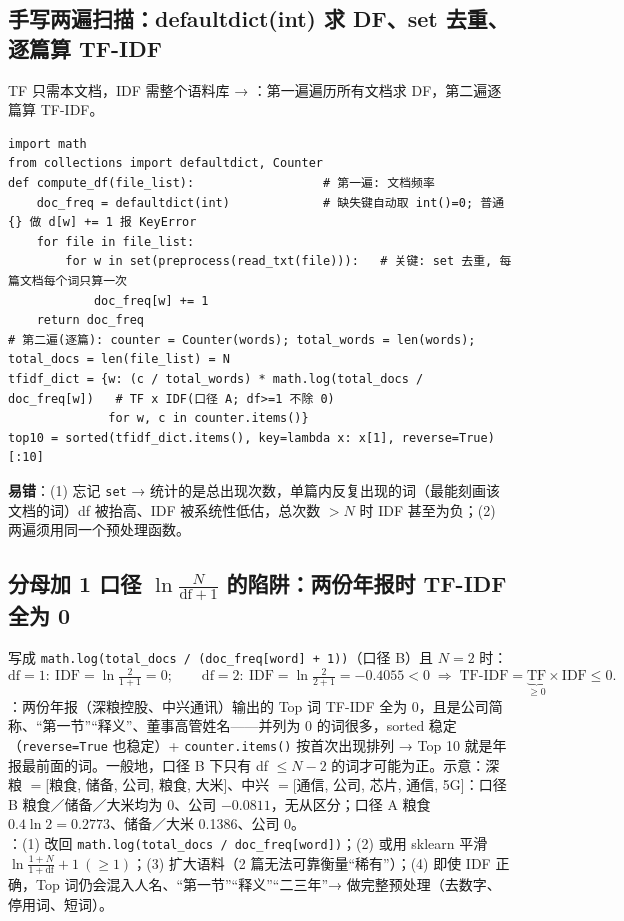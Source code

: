 \subsection{手写两遍扫描：defaultdict(int) 求 DF、set 去重、逐篇算 TF-IDF}
TF 只需本文档，IDF 需整个语料库 → ：第一遍遍历所有文档求 DF，第二遍逐篇算 TF-IDF。
\begin{lstlisting}[style=pyD08a]
import math
from collections import defaultdict, Counter
def compute_df(file_list):                  # 第一遍: 文档频率
    doc_freq = defaultdict(int)             # 缺失键自动取 int()=0; 普通 {} 做 d[w] += 1 报 KeyError
    for file in file_list:
        for w in set(preprocess(read_txt(file))):   # 关键: set 去重, 每篇文档每个词只算一次
            doc_freq[w] += 1
    return doc_freq
# 第二遍(逐篇): counter = Counter(words); total_words = len(words); total_docs = len(file_list) = N
tfidf_dict = {w: (c / total_words) * math.log(total_docs / doc_freq[w])   # TF x IDF(口径 A; df>=1 不除 0)
              for w, c in counter.items()}
top10 = sorted(tfidf_dict.items(), key=lambda x: x[1], reverse=True)[:10]
\end{lstlisting}
\textbf{易错}：(1) 忘记 \texttt{set} → 统计的是总出现次数，单篇内反复出现的词（最能刻画该文档的词）df 被抬高、IDF 被系统性低估，总次数 $>N$ 时 IDF 甚至为负；(2) 两遍须用同一个预处理函数。

\subsection{\texorpdfstring{分母加 1 口径 $\ln\frac{N}{\mathrm{df}+1}$ 的陷阱：两份年报时 TF-IDF 全为 0}{分母加 1 口径 ln(N/(df+1)) 的陷阱：两份年报时 TF-IDF 全为 0}}
写成 \texttt{math.log(total\_docs / (doc\_freq[word] + 1))}（口径 B）且 $N=2$ 时：
\[
\mathrm{df}=1:\ \mathrm{IDF}=\ln\tfrac{2}{1+1}=0;\qquad \mathrm{df}=2:\ \mathrm{IDF}=\ln\tfrac{2}{2+1}=-0.4055<0
\;\Longrightarrow\; \mathrm{TF\text{-}IDF}=\underbrace{\mathrm{TF}}_{\ge0}\times\mathrm{IDF}\le0 .
\]
：两份年报（深粮控股、中兴通讯）输出的 Top 词 TF-IDF 全为 0，且是公司简称、“第一节”“释义”、董事高管姓名——并列为 0 的词很多，sorted 稳定（\texttt{reverse=True} 也稳定）+ \texttt{counter.items()} 按首次出现排列 → Top 10 就是年报最前面的词。一般地，口径 B 下只有 df $\le N-2$ 的词才可能为正。示意：深粮 $=$[粮食, 储备, 公司, 粮食, 大米]、中兴 $=$[通信, 公司, 芯片, 通信, 5G]：口径 B 粮食／储备／大米均为 0、公司 $-0.0811$，无从区分；口径 A 粮食 $0.4\ln2=0.2773$、储备／大米 0.1386、公司 0。\\
：(1) 改回 \texttt{math.log(total\_docs / doc\_freq[word])}；(2) 或用 sklearn 平滑 $\ln\frac{1+N}{1+\mathrm{df}}+1\ (\ge1)$；(3) 扩大语料（2 篇无法可靠衡量“稀有”）；(4) 即使 IDF 正确，Top 词仍会混入人名、“第一节”“释义”“二三年”→ 做完整预处理（去数字、停用词、短词）。

